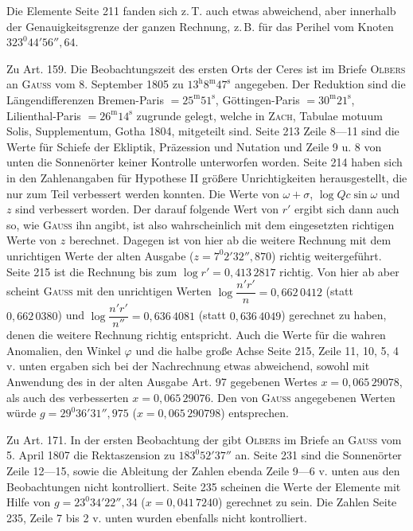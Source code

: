 Die Elemente Seite 211 fanden sich z.\,T. auch etwas abweichend, aber innerhalb der
Genauigkeitsgrenze der ganzen Rechnung, z.\,B. für das Perihel vom Knoten $323^0 44' 56''{,}64$.

Zu Art. 159. Die Beobachtungszeit des ersten Orts der Ceres ist im Briefe \textsc{Olbers}
an \textsc{Gauss} vom 8. September 1805 zu $13^{\mathrm h} 8^{\mathrm m} 47^{\mathrm s}$
angegeben. Der Reduktion sind die Längendifferenzen Bremen-Paris $= 25^{\mathrm m}
51^{\mathrm s}$, Göttingen-Paris $= 30^{\mathrm m} 21^{\mathrm s}$, Lilienthal-Paris $=
26^{\mathrm m} 14^{\mathrm s}$ zugrunde gelegt, welche in \textsc{Zach}, Tabulae motuum
Solis, Supplementum, Gotha 1804, mitgeteilt sind. Seite 213 Zeile 8---11 sind die Werte
für Schiefe der Ekliptik, Präzession und Nutation und Zeile 9 u. 8 von unten die
Sonnenörter keiner Kontrolle unterworfen worden. Seite 214 haben sich in den
Zahlenangaben für Hypothese II größere Unrichtigkeiten herausgestellt, die nur zum Teil
verbessert werden konnten. Die Werte von $\omega+\sigma$, $\log Qc\sin\omega$ und $z$
sind verbessert worden. Der darauf folgende Wert von $r'$ ergibt sich dann auch so, wie
\textsc{Gauss} ihn angibt, ist also wahrscheinlich mit dem eingesetzten richtigen Werte
von $z$ berechnet. Dagegen ist von hier ab die weitere Rechnung mit dem unrichtigen
Werte der alten Ausgabe ($z = 7^0 2' 32''{,}870$) richtig weitergeführt. Seite 215 ist die
Rechnung bis zum $\log r' = 0{,}413\,2817$ richtig. Von hier ab aber scheint
\textsc{Gauss} mit den unrichtigen Werten $\log\dfrac{n'r'}{n} = 0{,}662\,0412$ (statt
$0{,}662\,0380$) und $\log\dfrac{n'r'}{n''} = 0{,}636\,4081$ (statt $0{,}636\,4049$)
gerechnet zu haben, denen die weitere Rechnung richtig entspricht. Auch die Werte für die
wahren Anomalien, den Winkel $\varphi$ und die halbe große Achse Seite 215, Zeile 11, 10,
5, 4 v. unten ergaben sich bei der Nachrechnung etwas abweichend, sowohl mit Anwendung des
in der alten Ausgabe Art. 97 gegebenen
Wertes $x = 0{,}065\,29078$, als auch des verbesserten $x = 0{,}065\,29076$. Den von
\textsc{Gauss} angegebenen Werten würde $g = 29^0 36' 31''{,}975$ ($x = 0{,}065\,290798$)
entsprechen.

Zu Art. 171. In der ersten Beobachtung der  gibt \textsc{Olbers} im Briefe an
\textsc{Gauss} vom 5. April 1807 die Rektaszension zu $183^0 52' 37''$ an. Seite 231 sind
die Sonnenörter Zeile 12---15, sowie die Ableitung der Zahlen ebenda Zeile 9---6 v. unten
aus den Beobachtungen nicht kontrolliert. Seite 235 scheinen die Werte der Elemente mit
Hilfe von $g = 23^0 34' 22''{,}34$ ($x = 0{,}041\,7240$) gerechnet zu sein. Die Zahlen Seite
235, Zeile 7 bis 2 v. unten wurden ebenfalls nicht kontrolliert.

